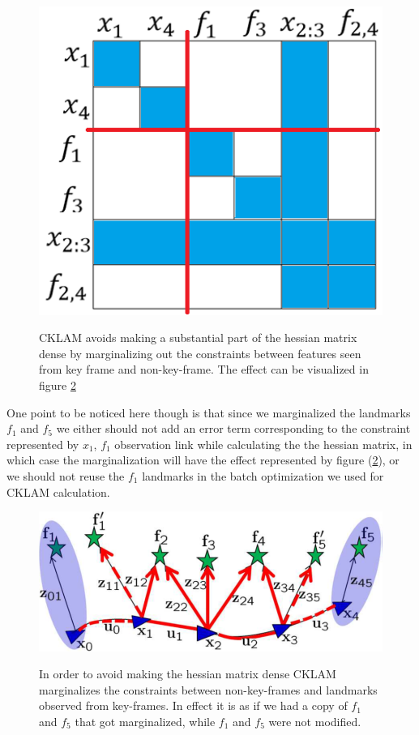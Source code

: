 \begin{figure}[ht]
	\centering
		\includegraphics[width=1.00\textwidth]{images/HessianSparsityAllFillUpKeepSparsity.png}
	\label{fig:HessianSparsityAllFillUpKeepSparsity}
  \caption{CKLAM avoids making a substantial part of the hessian matrix dense by marginalizing out the constraints between features seen from key frame and non-key-frame. The effect can be visualized in figure \ref{fig:CKLAMMarginalizationFeatureClone}}
\end{figure}

One point to be noticed here though is that since we marginalized the landmarks $f_1$ and $f_5$ we either should not add an error term corresponding to the constraint represented by $x_1$, $f_1$ observation link while calculating the the hessian matrix, in which case the marginalization will have the effect represented by figure (\ref{fig:CKLAMMarginalizationFeatureClone}), or we should not reuse the $f_1$ landmarks in the batch optimization we used for CKLAM calculation. 

\begin{figure}[ht]
	\centering
		\includegraphics[width=1.00\textwidth]{images/CKLAMMarginalizationFeatureClone.png}
	\label{fig:CKLAMMarginalizationFeatureClone}
  \caption{In order to avoid making the hessian matrix dense CKLAM marginalizes the constraints between non-key-frames and landmarks observed from key-frames. In effect it is as if we had a copy of $f_1$ and $f_5$ that got marginalized, while $f_1$ and $f_5$ were not modified. \cite{CKLAM}}
\end{figure}

